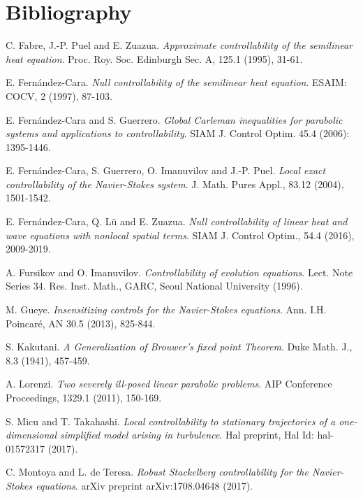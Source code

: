 \documentclass[preprint,1p]{elsarticle}
\begin{document}
\section*{Bibliography} 
\begin{thebibliography}{99}

 C. Fabre, J.-P. Puel and E. Zuazua. \emph{Approximate controllability of the semilinear heat equation}. Proc. Roy. Soc. Edinburgh Sec. A, 125.1 (1995), 31-61.

 E. Fern\'andez-Cara. \emph{Null controllability of the semilinear heat equation}. ESAIM: COCV, 2 (1997), 87-103.

 E. Fern\'andez-Cara and S. Guerrero. \emph{Global Carleman inequalities for parabolic systems and applications to controllability}. SIAM J. Control Optim. 45.4 (2006): 1395-1446.

 E. Fern{\'a}ndez-Cara, S. Guerrero, O. Imanuvilov and J.-P. Puel. \emph{Local exact controllability of the Navier-Stokes system}. J. Math. Pures Appl., 83.12 (2004), 1501-1542.

 E. Fern\'andez-Cara, Q. L\"u and E. Zuazua. \emph{Null controllability of linear heat and wave equations with nonlocal spatial terms}. SIAM J. Control Optim., 54.4 (2016), 2009-2019.

 A. Fursikov and O. Imanuvilov. \emph{Controllability of evolution equations}. Lect. Note Series 34. Res. Inst. Math., GARC, Seoul National University (1996).

 M. Gueye. \emph{Insensitizing controls for the Navier-Stokes equations}. Ann. I.H. Poincar\'e, AN 30.5 (2013), 825-844.

 S. Kakutani. \emph{A Generalization of Brouwer's fixed point Theorem}. Duke Math. J., 8.3 (1941),  457-459. 

 A. Lorenzi. \emph{Two severely ill-posed linear parabolic problems}. AIP Conference Proceedings, 1329.1 (2011), 150-169.

 S. Micu and T. Takahashi. \emph{Local controllability to stationary trajectories of a one-dimensional simplified model arising in turbulence}. Hal preprint, Hal Id: hal-01572317 (2017).

 C. Montoya and L. de Teresa. \emph{Robust Stackelberg controllability for the Navier-Stokes equations}. arXiv preprint arXiv:1708.04648 (2017).


\end{thebibliography}
\end{document}
